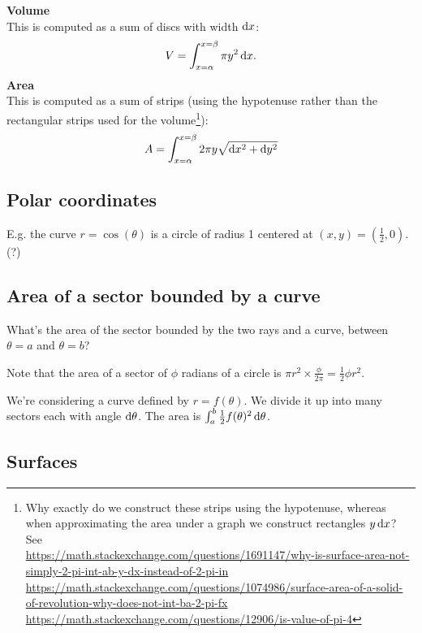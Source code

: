 \textbf{Volume}\\
This is computed as a sum of discs with width $\dx$:
\begin{align*}
  V = \int_{x=\alpha}^{x=\beta} \pi y^2 \dx.
\end{align*}
\textbf{Area}\\
This is computed as a sum of strips (using the hypotenuse rather than the rectangular strips used for the volume\footnote{Why exactly do we
  construct these strips using the hypotenuse, whereas when approximating the
  area under a graph we construct rectangles $y\dx$? See \\
  \url{https://math.stackexchange.com/questions/1691147/why-is-surface-area-not-simply-2-pi-int-ab-y-dx-instead-of-2-pi-in}\\
  \url{https://math.stackexchange.com/questions/1074986/surface-area-of-a-solid-of-revolution-why-does-not-int-ba-2-pi-fx}\\
  \url{https://math.stackexchange.com/questions/12906/is-value-of-pi-4}}):
\begin{align*}
  A = \int_{x=\alpha}^{x=\beta}  2\pi y \sqrt{\dx^2 + \dy^2}
\end{align*}


\subsection{Polar coordinates}

E.g. the curve $r = \cos(\theta)$ is a circle of radius 1 centered at
$(x, y) = (\frac{1}{2}, 0)$. (?)

\subsection*{Area of a sector bounded by a curve}

What's the area of the sector bounded by the two rays and a curve, between
$\theta=a$ and $\theta=b$?

Note that the area of a sector of $\phi$ radians of a circle is
$\pi r^2 \times \frac{\phi}{2\pi} = \frac{1}{2}\phi r^2$.

We're considering a curve defined by $r = f(\theta)$. We divide it up into many
sectors each with angle $\dtheta$. The area is
$\int_a^b \frac{1}{2}f(\theta)^2\dtheta$.

\subsection{Surfaces}

